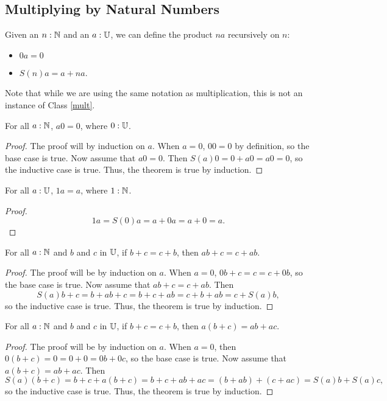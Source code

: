 \documentclass[../../math.tex]{subfiles}
\begin{document}
\subsection{Multiplying by Natural Numbers}

\begin{definition}
    Given an $n : \mathbb{N}$ and an $a : \mathbb{U}$, we can define the product $na$
    recursively on $n$:
    \begin{itemize}
        \item $0a = 0$
        \item $S(n)a = a + na$.
    \end{itemize}
    Note that while we are using the same notation as multiplication, this is
    not an instance of Class \ref{mult}.
\end{definition}

\begin{theorem}
    For all $a : \mathbb{N}$, $a0 = 0$, where $0 : \mathbb{U}$.
\end{theorem}
\begin{proof}
    The proof will by induction on $a$.  When $a = 0$, $00 = 0$ by definition,
    so the base case is true.  Now assume that $a0 = 0$.  Then $S(a)0 = 0 + a0 =
    a0 = 0$, so the inductive case is true.  Thus, the theorem is true by
    induction.
\end{proof}

\begin{theorem}
    For all $a : \mathbb{U}$, $1a = a$, where $1 : \mathbb{N}$.
\end{theorem}
\begin{proof}
    \[
        1a = S(0)a = a + 0a = a + 0 = a.
    \]
\end{proof}

\begin{theorem} \label{nat_mult_commute_single}
    For all $a : \mathbb{N}$ and $b$ and $c$ in $\mathbb{U}$, if $b + c = c + b$, then $ab + c =
    c + ab$.
\end{theorem}
\begin{proof}
    The proof will be by induction on $a$.  When $a = 0$, $0b + c = c = c + 0b$,
    so the base case is true.  Now assume that $ab + c = c + ab$.  Then
    \[
        S(a)b + c = b + ab + c = b + c + ab = c + b + ab = c + S(a)b,
    \]
    so the inductive case is true.  Thus, the theorem is true by induction.
\end{proof}

\begin{theorem}
    For all $a : \mathbb{N}$ and $b$ and $c$ in $\mathbb{U}$, if $b + c = c + b$, then $a(b + c)
    = ab + ac$.
\end{theorem}
\begin{proof}
    The proof will be by induction on $a$.  When $a = 0$, then $0(b + c) = 0 = 0
    + 0 = 0b + 0c$, so the base case is true.  Now assume that $a(b + c) = ab +
    ac$.  Then
    \[
        S(a)(b + c) = b + c + a(b + c) = b + c + ab + ac = (b + ab) + (c + ac) =
        S(a)b + S(a)c,
    \]
    so the inductive case is true.  Thus, the theorem is true by induction.
\end{proof}
\end{document}
